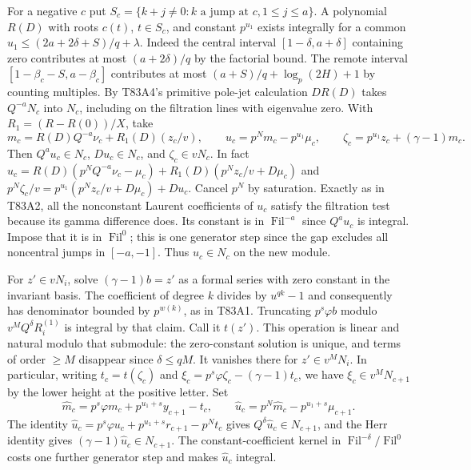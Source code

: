 For a negative $c$ put $S_c=\{k+j\ne0:k\text{ a jump at }c,1\le j\le a\}$. A polynomial $R(D)$ with roots $c(t)$,
$t\in S_c$, and constant $p^{u_1}$ exists integrally for a
common $u_1\le(2a+2\delta+S)/q+\lambda$.
Indeed the central interval $[1-\delta,a+\delta]$ containing
zero contributes at most $(a+2\delta)/q$ by the factorial bound.
The remote interval $[1-\beta_c-S,a-\beta_c]$ contributes at most
$(a+S)/q+\log_p(2H)+1$ by counting multiples. By T83A4's
primitive pole-jet calculation $D R(D)$ takes $Q^{-a}N_c$
into $N_c$, including on the filtration lines with eigenvalue
zero. With $R_1=(R-R(0))/X$, take
\[
 m_c=R(D)Q^{-a}\nu_c+R_1(D)(z_c/v),\qquad
 u_c=p^Nm_c-p^{u_1}\mu_c,\qquad
 \zeta_c=p^{u_1}z_c+(\gamma-1)m_c.
\]
Then $Q^a u_c\in N_c$, $Du_c\in N_c$, and $\zeta_c\in vN_c$.
In fact $u_c=R(D)(p^NQ^{-a}\nu_c-\mu_c)
 +R_1(D)(p^Nz_c/v+D\mu_c)$ and
$p^N\zeta_c/v=p^{u_1}(p^Nz_c/v+D\mu_c)+Du_c$.
Cancel $p^N$ by saturation. Exactly as in T83A2, all the
nonconstant Laurent coefficients of $u_c$ satisfy the filtration
test because its gamma difference does. Its constant is in
$\operatorname{Fil}^{-a}$ since $Q^a u_c$ is integral.
Impose that it is in $\operatorname{Fil}^0$; this is one
generator step since the gap excludes all noncentral jumps in
$[-a,-1]$. Thus $u_c\in N_c$ on the new module.

For $z'\in vN_i$, solve $(\gamma-1)b=z'$ as a formal series
with zero constant in the invariant basis. The coefficient of
degree $k$ divides by $u^{qk}-1$ and consequently has denominator
bounded by $p^{w(k)}$, as in T83A1. Truncating $p^s\varphi b$
modulo $v^MQ^\delta R_i^{(1)}$ is integral by that claim.
Call it $t(z')$. This operation is linear and natural modulo that
submodule: the zero-constant solution is unique, and terms of
order $\ge M$ disappear since $\delta\le qM$. It vanishes there
for $z'\in v^MN_i$. In particular, writing
$t_c=t(\zeta_c)$ and
$\xi_c=p^s\varphi\zeta_c-(\gamma-1)t_c$, we have
$\xi_c\in v^MN_{c+1}$ by the lower height at the positive letter.
Set
\[
 \widehat m_c=p^s\varphi m_c+p^{u_1+s}y_{c+1}-t_c,\qquad
 \widehat u_c=p^N\widehat m_c-p^{u_1+s}\mu_{c+1}.
\]
The identity $\widehat u_c=p^s\varphi u_c+
p^{u_1+s}r_{c+1}-p^Nt_c$ gives
$Q^\delta\widehat u_c\in N_{c+1}$, and the Herr identity gives
$(\gamma-1)\widehat u_c\in N_{c+1}$. The constant-coefficient
kernel in $\operatorname{Fil}^{-\delta}/\operatorname{Fil}^0$
costs one further generator step and makes $\widehat u_c$ integral.

